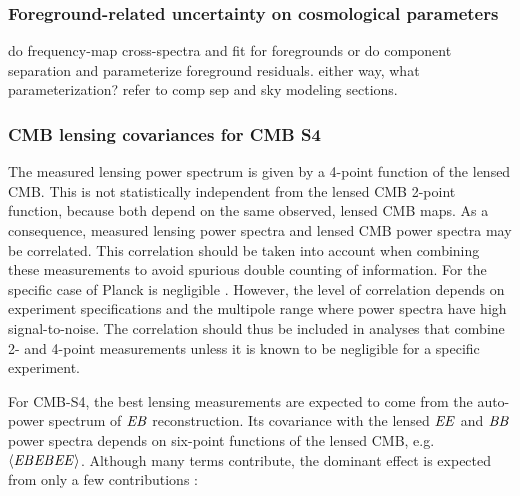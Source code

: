 \subsubsection{Foreground-related uncertainty on cosmological parameters}
\label{se:paramforeg}

 do frequency-map cross-spectra and fit for foregrounds or do component separation and 
 parameterize foreground residuals. either way, what parameterization? refer to comp sep
 and sky modeling sections.

\subsubsection{CMB lensing covariances for CMB S4}
\label{se:covs}

The measured lensing power spectrum is given by a 4-point function of the lensed CMB.  This is not statistically independent from the lensed CMB 2-point function, because both depend on the same observed, lensed CMB maps.  As a consequence, measured lensing power spectra and lensed CMB power spectra may be correlated.  This correlation should be taken into account when combining these measurements to avoid spurious double counting of information.  For the specific case of Planck is negligible  \cite{marcel1308}.  However, the level of correlation depends on experiment specifications and the multipole range where power spectra have high signal-to-noise.  The correlation should thus be included in analyses that combine 2- and 4-point measurements unless it is known to be negligible for a specific experiment. 

For CMB-S4, the best lensing measurements are expected to come from the auto-power spectrum of $\mathit{EB}$ reconstruction.  Its covariance with the lensed $\mathit{EE}$ and $\mathit{BB}$ power spectra depends on six-point functions of the lensed CMB, e.g.~$\langle \mathit{EB}\mathit{EB}\mathit{EE} \rangle$. Although many terms contribute, the dominant effect is expected from only a few contributions \cite{marcel1308}:  

